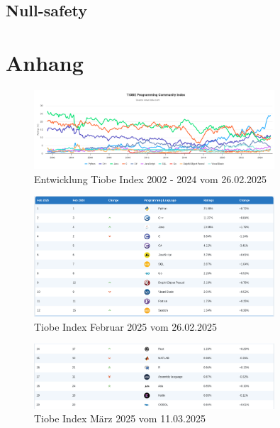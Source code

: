 \documentclass[11pt]{article}
\begin{document}
    \subsection{Null-safety}



    \printbibliography[
        heading=bibintoc,
        title={Literaturverzeichnis}
    ]
    \appendix


    \section{Anhang}

    \begin{figure}[h]
        \centering
        \includegraphics[width=0.8\textwidth]{pictures/Screenshot 2025-02-26 at 19-53-49 TIOBE Index - TIOBE}
        \caption{Entwicklung Tiobe Index 2002 - 2024 vom 26.02.2025 }
        \label{fig:entwicklung-tiobe}
    \end{figure}

    \begin{figure}[h]
        \centering
        \includegraphics[width=0.8\textwidth]{pictures/Screenshot 2025-02-26 at 19-54-42 TIOBE Index - TIOBE}
        \caption{Tiobe Index Februar 2025 vom 26.02.2025}
        \label{fig:tiobe-java-2025}
    \end{figure}

    \begin{figure}[h]
        \centering
        \includegraphics[width=0.8\textwidth]{pictures/Screenshot 2025-03-11 at 22-21-04 TIOBE Index - TIOBE}
        \caption{Tiobe Index März 2025 vom 11.03.2025}
        \label{fig:tiobe-kotlin-2025}
    \end{figure}
\end{document}
